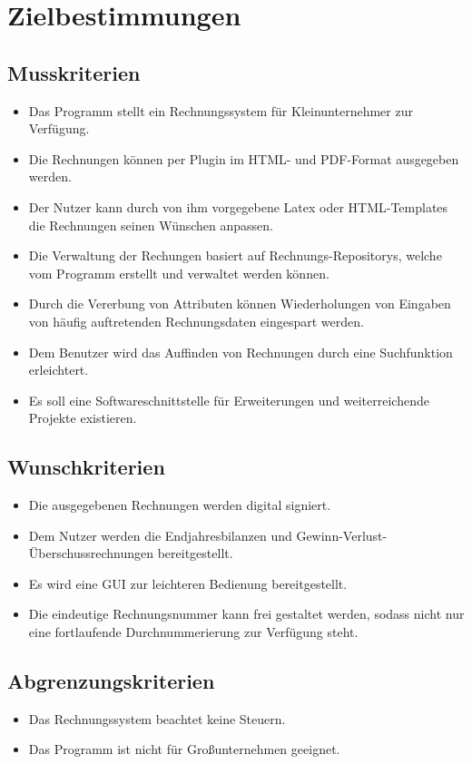 
\section{Zielbestimmungen}



\subsection{Musskriterien}

\begin{itemize}
	\item Das Programm stellt ein Rechnungssystem für Kleinunternehmer zur Verfügung.
	\item Die Rechnungen können per Plugin im HTML- und PDF-Format ausgegeben werden.
	\item Der Nutzer kann durch von ihm vorgegebene Latex oder HTML-Templates die Rechnungen seinen Wünschen anpassen.
	\item Die Verwaltung der Rechungen basiert auf Rechnungs-Repositorys, welche vom Programm erstellt und verwaltet werden können.
	\item Durch die Vererbung von Attributen können Wiederholungen von Eingaben von häufig auftretenden Rechnungsdaten eingespart werden.
	\item Dem Benutzer wird das Auffinden von Rechnungen durch eine Suchfunktion erleichtert.
	\item Es soll eine Softwareschnittstelle für Erweiterungen und weiterreichende Projekte existieren. 
\end{itemize}

\subsection{Wunschkriterien}

\begin{itemize}
	\item Die ausgegebenen Rechnungen werden digital signiert.
	\item Dem Nutzer werden die Endjahresbilanzen und Gewinn-Verlust-Überschussrechnungen bereitgestellt.
	\item Es wird eine GUI zur leichteren Bedienung bereitgestellt.
	\item Die eindeutige Rechnungsnummer kann frei gestaltet werden, sodass nicht nur eine fortlaufende Durchnummerierung zur Verfügung steht.
\end{itemize}

\subsection{Abgrenzungskriterien}

\begin{itemize}
	\item Das Rechnungssystem beachtet keine Steuern.
	\item Das Programm ist nicht für Großunternehmen geeignet.
\end{itemize}
